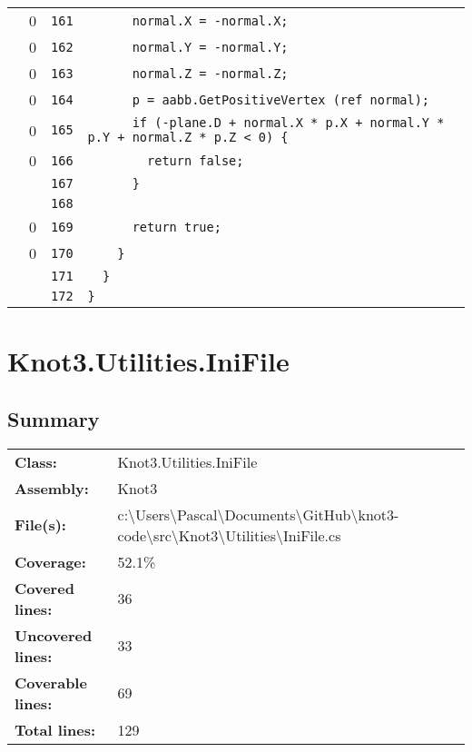 \documentclass[a4paper,10pt]{article}
\begin{document}
\begin{longtable}[l]{lrrl}
\cellcolor{red} & 0 & \verb~161~ & \verb~      normal.X = -normal.X;~\\
\cellcolor{red} & 0 & \verb~162~ & \verb~      normal.Y = -normal.Y;~\\
\cellcolor{red} & 0 & \verb~163~ & \verb~      normal.Z = -normal.Z;~\\
\cellcolor{red} & 0 & \verb~164~ & \verb~      p = aabb.GetPositiveVertex (ref normal);~\\
\cellcolor{red} & 0 & \verb~165~ & \verb~      if (-plane.D + normal.X * p.X + normal.Y * p.Y + normal.Z * p.Z < 0) {~\\
\cellcolor{red} & 0 & \verb~166~ & \verb~        return false;~\\
\cellcolor{gray} &  & \verb~167~ & \verb~      }~\\
\cellcolor{gray} &  & \verb~168~ & \verb~~\\
\cellcolor{red} & 0 & \verb~169~ & \verb~      return true;~\\
\cellcolor{red} & 0 & \verb~170~ & \verb~    }~\\
\cellcolor{gray} &  & \verb~171~ & \verb~  }~\\
\cellcolor{gray} &  & \verb~172~ & \verb~}~\\
\end{longtable}
\newpage
\section{Knot3.Utilities.IniFile}
\subsection{Summary}
\begin{longtable}[l]{ll}
\textbf{Class:} & Knot3.Utilities.IniFile\\
\textbf{Assembly:} & Knot3\\
\textbf{File(s):} & \begin{minipage}[t]{12cm}{c:\textbackslash Users\textbackslash Pascal\textbackslash Documents\textbackslash GitHub\textbackslash knot3-code\textbackslash src\textbackslash Knot3\textbackslash Utilities\textbackslash IniFile.cs}\end{minipage} \\
\textbf{Coverage:} & 52.1\%\\
\textbf{Covered lines:} & 36\\
\textbf{Uncovered lines:} & 33\\
\textbf{Coverable lines:} & 69\\
\textbf{Total lines:} & 129\\
\end{longtable}
\end{document}

